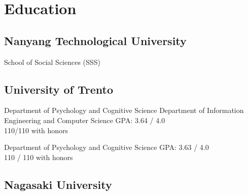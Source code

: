 \documentclass[a4paper]{deedy-resume} %
\begin{document}
%
\begin{minipage}[t]{0.63\textwidth} %


\section{Education} 

\subsection{Nanyang Technological University}
School of Social Sciences (SSS)

\sectionspace %

\subsection{University of Trento}

Department of Psychology and Cognitive Science
Department of Information Engineering and Computer Science
GPA: 3.64 / 4.0\\
110/110 with honors\\

\sectionspace %

Department of Psychology and Cognitive Science
GPA: 3.63 / 4.0 \\
110 / 110 with honors\\

\sectionspace %

\subsection{Nagasaki University}


\sectionspace %


\end{minipage}
\end{document}
